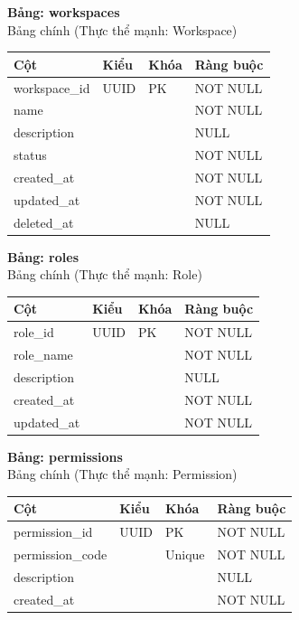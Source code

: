 \textbf{Bảng: workspaces}\\
Bảng chính (Thực thể mạnh: Workspace)
\begin{table}[H]
\centering
\begin{tabular}{|l|l|l|l|}
\hline
\textbf{Cột} & \textbf{Kiểu} & \textbf{Khóa} & \textbf{Ràng buộc} \\ \hline
workspace\_id & UUID & PK & NOT NULL \\ \hline
name & & & NOT NULL \\ \hline
description & & & NULL \\ \hline
status & & & NOT NULL \\ \hline
created\_at & & & NOT NULL \\ \hline
updated\_at & & & NOT NULL \\ \hline
deleted\_at & & & NULL \\ \hline
\end{tabular}
\end{table}

\textbf{Bảng: roles}\\
Bảng chính (Thực thể mạnh: Role)
\begin{table}[H]
\centering
\begin{tabular}{|l|l|l|l|}
\hline
\textbf{Cột} & \textbf{Kiểu} & \textbf{Khóa} & \textbf{Ràng buộc} \\ \hline
role\_id & UUID & PK & NOT NULL \\ \hline
role\_name & & & NOT NULL \\ \hline
description & & & NULL \\ \hline
created\_at & & & NOT NULL \\ \hline
updated\_at & & & NOT NULL \\ \hline
\end{tabular}
\end{table}

\textbf{Bảng: permissions}\\
Bảng chính (Thực thể mạnh: Permission)
\begin{table}[H]
\centering
\begin{tabular}{|l|l|l|l|}
\hline
\textbf{Cột} & \textbf{Kiểu} & \textbf{Khóa} & \textbf{Ràng buộc} \\ \hline
permission\_id & UUID & PK & NOT NULL \\ \hline
permission\_code & & Unique & NOT NULL \\ \hline
description & & & NULL \\ \hline
created\_at & & & NOT NULL \\ \hline
\end{tabular}
\end{table}

